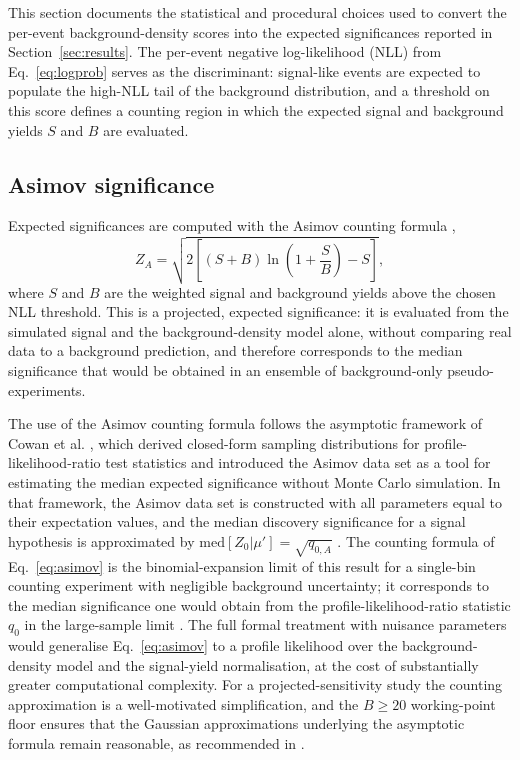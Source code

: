 \documentclass[11pt,a4paper,twocolumn]{article}
\begin{document}
This section documents the statistical and procedural choices used to
convert the per-event background-density scores into the expected
significances reported in Section~\ref{sec:results}. The per-event negative
log-likelihood (NLL) from Eq.~\eqref{eq:logprob} serves as the discriminant:
signal-like events are expected to populate the high-NLL tail of the
background distribution, and a threshold on this score defines a counting
region in which the expected signal and background yields $S$ and $B$ are
evaluated.

\subsection{Asimov significance}

Expected significances are computed with the Asimov counting formula
\cite{cowan_asymptotic},
\begin{equation}
  Z_A = \sqrt{2\left[(S+B)\ln\left(1+\frac{S}{B}\right)-S\right]},
  \label{eq:asimov}
\end{equation}
where $S$ and $B$ are the weighted signal and background yields above the
chosen NLL threshold. This is a projected, expected significance: it is
evaluated from the simulated signal and the background-density model alone,
without comparing real data to a background prediction, and therefore
corresponds to the median significance that would be obtained in an
ensemble of background-only pseudo-experiments.

The use of the Asimov counting formula follows the asymptotic framework of
Cowan et al. \cite{cowan_asymptotic}, which derived closed-form sampling
distributions for profile-likelihood-ratio test statistics and introduced
the Asimov data set as a tool for estimating the median expected
significance without Monte Carlo simulation. In that framework, the Asimov
data set is constructed with all parameters equal to their expectation
values, and the median discovery significance for a signal hypothesis is
approximated by $\mathrm{med}[Z_0|\mu'] = \sqrt{q_{0,A}}$
\cite{cowan_asymptotic}. The counting formula of Eq.~\eqref{eq:asimov} is
the binomial-expansion limit of this result for a single-bin counting
experiment with negligible background uncertainty; it corresponds to the
median significance one would obtain from the profile-likelihood-ratio
statistic $q_0$ in the large-sample limit \cite{cowan_asymptotic}. The
full formal treatment with nuisance parameters would generalise
Eq.~\eqref{eq:asimov} to a profile likelihood over the background-density
model and the signal-yield normalisation, at the cost of substantially
greater computational complexity. For a projected-sensitivity study the
counting approximation is a well-motivated simplification, and the
$B\geq20$ working-point floor ensures that the Gaussian approximations
underlying the asymptotic formula remain reasonable, as recommended in
\cite{cowan_asymptotic}.
\end{document}
